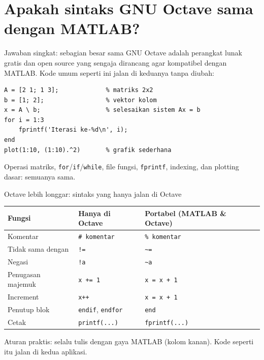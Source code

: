 \documentclass[aspectratio=169,11pt]{beamer}
\begin{document}
\section{Apakah sintaks GNU Octave sama dengan MATLAB?}

\begin{frame}[fragile]{Jawaban singkat: sebagian besar sama}
GNU Octave adalah perangkat lunak \alert{gratis dan open source} yang
sengaja dirancang agar kompatibel dengan MATLAB. Kode umum seperti ini jalan
di keduanya tanpa diubah:
\vspace{0.3em}
\begin{lstlisting}
A = [2 1; 1 3];             % matriks 2x2
b = [1; 2];                 % vektor kolom
x = A \ b;                  % selesaikan sistem Ax = b
for i = 1:3
    fprintf('Iterasi ke-%d\n', i);
end
plot(1:10, (1:10).^2)       % grafik sederhana
\end{lstlisting}
\small Operasi matriks, \texttt{for}/\texttt{if}/\texttt{while}, file fungsi,
\texttt{fprintf}, indexing, dan plotting dasar: semuanya sama.
\end{frame}

\begin{frame}[fragile]{Octave lebih longgar: sintaks yang hanya jalan di Octave}
\centering\small
\renewcommand{\arraystretch}{1.15}
\begin{tabular}{l l l}
\toprule
Fungsi & Hanya di Octave & Portabel (MATLAB \& Octave) \\
\midrule
Komentar        & \texttt{\# komentar}      & \texttt{\% komentar} \\
Tidak sama dengan & \texttt{!=}             & \texttt{\textasciitilde=} \\
Negasi          & \texttt{!a}               & \texttt{\textasciitilde a} \\
Penugasan majemuk & \texttt{x += 1}         & \texttt{x = x + 1} \\
Increment       & \texttt{x++}              & \texttt{x = x + 1} \\
Penutup blok    & \texttt{endif}, \texttt{endfor} & \texttt{end} \\
Cetak           & \texttt{printf(...)}      & \texttt{fprintf(...)} \\
\bottomrule
\end{tabular}

\vspace{0.8em}
\raggedright
\alert{Aturan praktis:} selalu tulis dengan gaya MATLAB (kolom kanan).
Kode seperti itu jalan di kedua aplikasi.
\end{frame}
\end{document}
